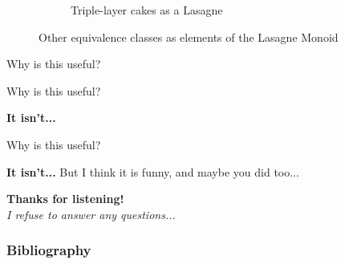 \documentclass{beamer}
\begin{document}
\begin{frame}
\begin{figure}
\begin{subfigure}{.24\textwidth}
          \caption{\label{fig:cake-lasagne}Triple-layer cakes as a Lasagne}
        \end{subfigure}
        \caption{\label{fig:lasagne-subclasses}Other equivalence classes as elements of the Lasagne Monoid}
    \end{figure}
\end{frame}

\begin{frame}{Why is this useful?}
\end{frame}

\begin{frame}{Why is this useful?}
    \begin{center}
        \Huge\textbf{It isn't...}
    \end{center}
\end{frame}

\begin{frame}{Why is this useful?}
    \begin{center}
        \Huge\textbf{It isn't...}
        \vskip 2cm
        \small{But I think it is funny, and maybe you did too...}
    \end{center}
\end{frame}

\begin{frame}
    \begin{center}
        \Huge\textbf{Thanks for listening!} \\
        \vskip 1cm
        \pause
        \Large\textit{I refuse to answer any questions...}
    \end{center}
\end{frame}


%         
%         

\begin{frame}[t,allowframebreaks]
\frametitle{Bibliography}
\printbibliography[heading=none]
\end{frame}
\end{document}
